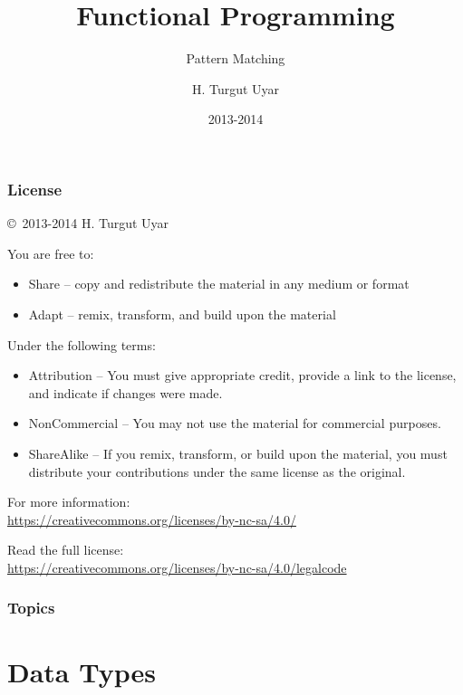 \documentclass[dvipsnames]{beamer}
\title{Functional Programming}
\subtitle{Pattern Matching}
\author{H. Turgut Uyar}
\date{2013-2014}
\theoremstyle{plain}
\begin{document}
\begin{frame}
  \titlepage
\end{frame}

\begin{frame}
  \frametitle{License}

  \hfill
  \copyright~2013-2014 H. Turgut Uyar

  \vfill
  \begin{footnotesize}
    You are free to:
    \begin{itemize}
      \itemsep0em
      \item Share -- copy and redistribute the material in any medium or format
      \item Adapt -- remix, transform, and build upon the material
    \end{itemize}

    Under the following terms:
    \begin{itemize}
      \itemsep0em
      \item Attribution -- You must give appropriate credit, provide a link to
        the license, and indicate if changes were made.

      \item NonCommercial -- You may not use the material for commercial
        purposes.

      \item ShareAlike -- If you remix, transform, or build upon the material,
        you must distribute your contributions under the same license as the
        original.
    \end{itemize}
  \end{footnotesize}

  \begin{small}
    For more information:\\
    \url{https://creativecommons.org/licenses/by-nc-sa/4.0/}

    \smallskip
    Read the full license:\\
    \url{https://creativecommons.org/licenses/by-nc-sa/4.0/legalcode}
  \end{small}
\end{frame}

\begin{frame}
  \frametitle{Topics}
  \tableofcontents
\end{frame}

\section{Data Types}
\end{document}
